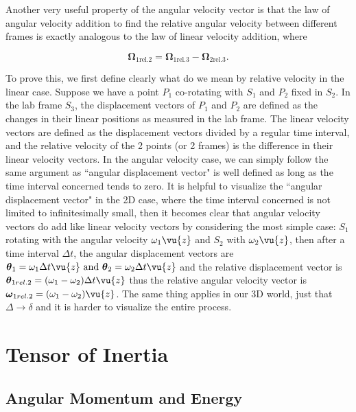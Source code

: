 \documentclass[a4paper,12pt]{report}
\begin{document}
Another very useful property of the angular velocity vector is that the law of angular velocity addition to find the relative angular velocity between different frames is exactly analogous to the law of linear velocity addition, where

\begin{equation}
	\boldsymbol{\Omega }  _{1 \text{rel.} 2} = \boldsymbol{\Omega} _{ 1 \text{rel.} 3}- \boldsymbol{\Omega }_{ 2 \text{rel.} 3}. \label{avad} 
\end{equation}

To prove this, we first define clearly what do we mean by relative velocity in the linear case. Suppose we have a point \(P_1\) co-rotating with \(S_1\) and \(P_2\) fixed in \(S_2\). In the lab frame \(S_3\), the displacement vectors of \(P_1\) and \(P_2\) are defined as the changes in their linear positions as measured in the lab frame. The linear velocity vectors are defined as the displacement vectors divided by a regular time interval, and the relative velocity of the 2 points (or 2 frames) is the difference in their linear velocity vectors. In the angular velocity case, we can simply follow the same argument as ``angular displacement vector" is well defined as long as the time interval concerned tends to zero. It is helpful to visualize the ``angular displacement vector" in the 2D case, where the time interval concerned is not limited to infinitesimally small, then it becomes clear that angular velocity vectors do add like linear velocity vectors by considering the most simple case: \(S_1\) rotating with the angular velocity \(\omega _{1} \vu{z} \) and \(S_2\) with \(\omega _{2} \vu{z} \), then after a time interval \(\Delta t\), the angular displacement vectors are \(\boldsymbol{\theta } _{1}  = \omega _{1}  \Delta t \vu{z} \text{ and } \boldsymbol{\theta } _{2}   = \omega _{2} \Delta t \vu{z} \) and the relative displacement vector is \(\boldsymbol{\theta }  _{1 rel. 2} = (\omega _{1} - \omega _{2}) \Delta t \vu{z} \) thus the relative angular velocity vector is \(\boldsymbol{\omega }  _{1 rel. 2} = (\omega _{1} - \omega _{2} )\vu{z} \). The same thing applies in our 3D world, just that \(\Delta \rightarrow \delta \) and it is harder to visualize the entire process. 



\section{Tensor of Inertia}

\subsection{Angular Momentum and Energy}
\end{document}
